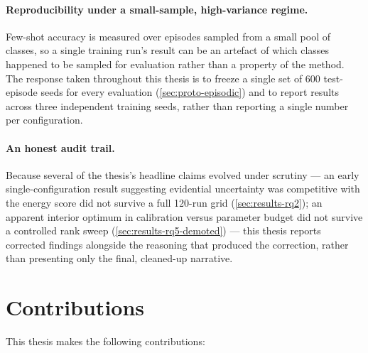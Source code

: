 \documentclass{iutbscthesis}
\begin{document}
\paragraph{Reproducibility under a small-sample, high-variance regime.} Few-shot accuracy is measured over episodes sampled from a small pool of classes, so a single training run's result can be an artefact of which classes happened to be sampled for evaluation rather than a property of the method. The response taken throughout this thesis is to freeze a single set of 600 test-episode seeds for every evaluation (\autoref{sec:proto-episodic}) and to report results across three independent training seeds, rather than reporting a single number per configuration.

\paragraph{An honest audit trail.} Because several of the thesis's headline claims evolved under scrutiny — an early single-configuration result suggesting evidential uncertainty was competitive with the energy score did not survive a full 120-run grid (\autoref{sec:results-rq2}); an apparent interior optimum in calibration versus parameter budget did not survive a controlled rank sweep (\autoref{sec:results-rq5-demoted}) — this thesis reports corrected findings alongside the reasoning that produced the correction, rather than presenting only the final, cleaned-up narrative.

\section{Contributions}

This thesis makes the following contributions:
\end{document}

